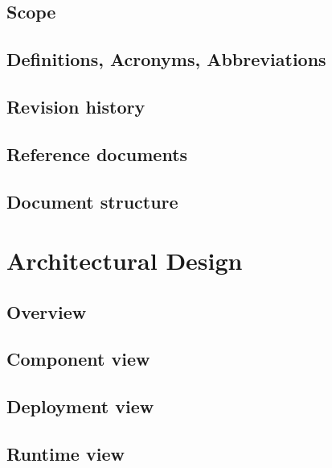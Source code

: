 \documentclass[a4paper,oneside,11pt]{article}
\begin{document}
        \subsection{Scope}
            
        \subsection{Definitions, Acronyms, Abbreviations}
            

                        \newpage
        \subsection{Revision history}
         
             \newpage

        \subsection{Reference documents}
            
        \subsection{Document structure}
        
    
    \newpage
    \section{Architectural Design}
        \subsection{Overview}
            
        \subsection{Component view}
            
        \subsection{Deployment view}
            
        \subsection{Runtime view}
            
\end{document}
